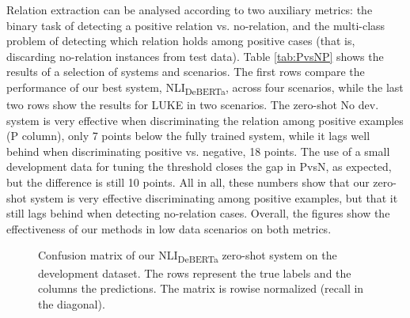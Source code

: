 \documentclass[11pt]{article}
\begin{document}
Relation extraction can be analysed according to two auxiliary metrics: the binary task of detecting a positive relation vs. no-relation, and the multi-class problem of detecting which relation holds among positive cases (that is, discarding no-relation instances from test data). Table \ref{tab:PvsNP} shows the results of a selection of systems and scenarios. The first rows compare the performance of our best system, NLI\textsubscript{DeBERTa}, across four scenarios, while the last two rows show the results for LUKE in two scenarios. The zero-shot No dev. system is very effective when discriminating the relation among positive examples (P column), only 7 points below the fully trained system, while it lags well behind when discriminating positive vs. negative, 18 points. The use of a small development data for tuning the  threshold closes the gap in PvsN, as expected, but the difference is still 10 points. All in all, these numbers show that our zero-shot system is very effective discriminating among positive examples, but that it still lags behind when detecting no-relation cases. Overall, the figures show the effectiveness of our methods in low data scenarios on both metrics.




\begin{figure*}[ht]
    \centering
    \caption{Confusion matrix of our NLI\textsubscript{DeBERTa} zero-shot system on the development dataset. The rows represent the true labels and the columns the predictions. The matrix is rowise normalized (recall in the diagonal).}
    \label{fig:cm}
\end{figure*}
\end{document}
